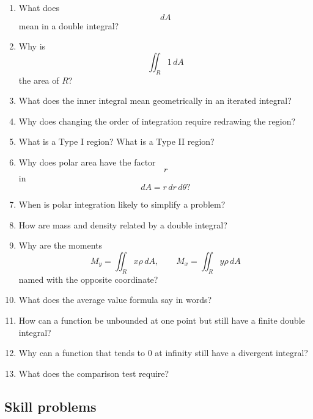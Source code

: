 \begin{enumerate}
\item What does
\[
    dA
\]
mean in a double integral?

\item Why is
\[
    \iint_R 1\,dA
\]
the area of \(R\)?

\item What does the inner integral mean geometrically in an iterated integral?

\item Why does changing the order of integration require redrawing the region?

\item What is a Type I region?  What is a Type II region?

\item Why does polar area have the factor
\[
    r
\]
in
\[
    dA=r\,dr\,d\theta?
\]

\item When is polar integration likely to simplify a problem?

\item How are mass and density related by a double integral?

\item Why are the moments
\[
    M_y=\iint_R x\rho\,dA,
    \qquad
    M_x=\iint_R y\rho\,dA
\]
named with the opposite coordinate?

\item What does the average value formula say in words?

\item How can a function be unbounded at one point but still have a finite double
integral?

\item Why can a function that tends to \(0\) at infinity still have a divergent integral?

\item What does the comparison test require?
\end{enumerate}

\subsection{Skill problems}


